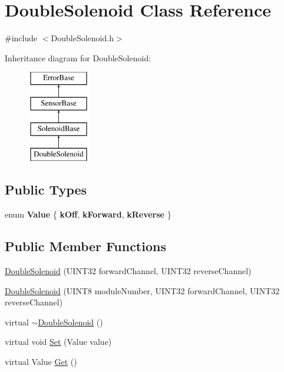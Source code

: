 \hypertarget{classDoubleSolenoid}{
\section{DoubleSolenoid Class Reference}
\label{classDoubleSolenoid}
}


{\ttfamily \#include $<$DoubleSolenoid.h$>$}

Inheritance diagram for DoubleSolenoid:\begin{figure}[H]
\begin{center}
\leavevmode
\includegraphics[height=4.000000cm]{classDoubleSolenoid}
\end{center}
\end{figure}
\subsection*{Public Types}
\begin{DoxyCompactItemize}
\item 
enum {\bfseries Value} \{ {\bfseries kOff}, 
{\bfseries kForward}, 
{\bfseries kReverse}
 \}
\end{DoxyCompactItemize}
\subsection*{Public Member Functions}
\begin{DoxyCompactItemize}
\item 
\hyperlink{classDoubleSolenoid_af543be114c3c7ab9df19bcb91917fbe1}{DoubleSolenoid} (UINT32 forwardChannel, UINT32 reverseChannel)
\item 
\hyperlink{classDoubleSolenoid_a58c07ccb8ec7a5aefd2d0c0591f258e8}{DoubleSolenoid} (UINT8 moduleNumber, UINT32 forwardChannel, UINT32 reverseChannel)
\item 
virtual \hyperlink{classDoubleSolenoid_a6bb0815514cc362a87def521fd544508}{$\sim$DoubleSolenoid} ()
\item 
virtual void \hyperlink{classDoubleSolenoid_a538ae9e357b7c97e01f213f8fe0a7c20}{Set} (Value value)
\item 
virtual Value \hyperlink{classDoubleSolenoid_a831cbfdb95c2c689bfd6644a01694fe8}{Get} ()
\end{DoxyCompactItemize}


